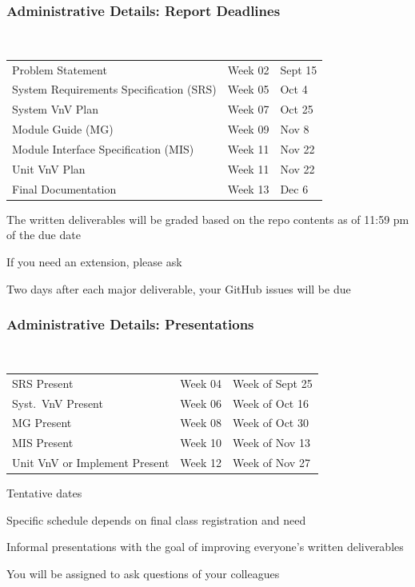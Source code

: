 \documentclass[t,12pt,numbers,fleqn]{beamer}
\begin{document}
\begin{frame}
\frametitle{Administrative Details: Report Deadlines}
~\newline
\begin{tabular}{l l l}
Problem Statement & Week 02 & Sept 15\\
System Requirements Specification (SRS) & Week 05 & Oct 4\\
System VnV Plan & Week 07 & Oct 25\\
Module Guide (MG) & Week 09 & Nov 8\\
Module Interface Specification (MIS) & Week 11 & Nov 22\\
Unit VnV Plan & Week 11 & Nov 22\\
Final Documentation & Week 13 & Dec 6\\
\end {tabular}

\bi
\item The written deliverables will be graded based on the repo contents as of
11:59 pm of the due date
\item If you need an extension, please ask
\item Two days after each major deliverable, your GitHub issues will be due
\ei

\end{frame}


\begin{frame}
\frametitle{Administrative Details: Presentations}

~\newline
\begin{tabular}{l l l}
SRS Present & Week 04 & Week of Sept 25\\
Syst.\ VnV Present & Week 06 & Week of Oct 16\\
MG Present & Week 08 & Week of Oct 30\\
MIS Present & Week 10 & Week of Nov 13\\
Unit VnV or Implement Present & Week 12 & Week of Nov 27\\
\end {tabular}

\bi
\item Tentative dates
\item Specific schedule depends on final class registration and need
\item Informal presentations with the goal of improving everyone's written
  deliverables
\item You will be assigned to ask questions of your colleagues
\ei

\end{frame}
\end{document}
